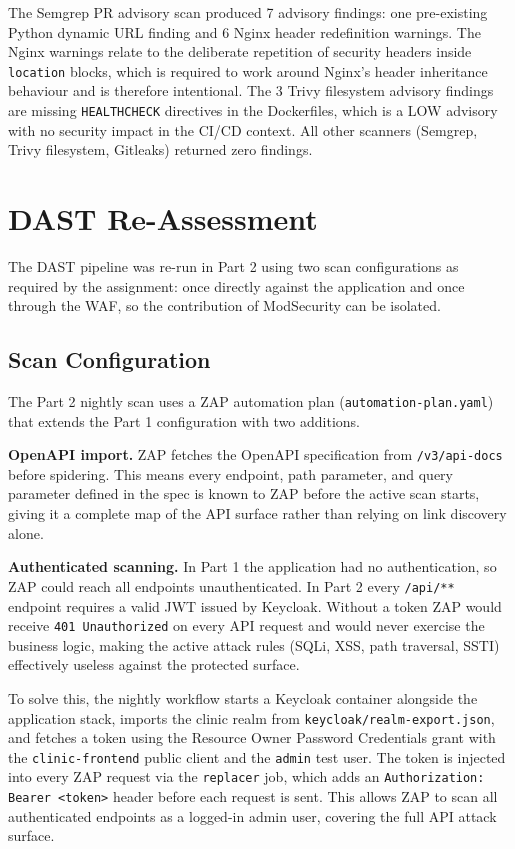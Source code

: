 \documentclass[12pt,a4paper]{report}
\begin{document}
The Semgrep PR advisory scan produced 7 advisory findings: one pre-existing Python dynamic
URL finding and 6 Nginx header redefinition warnings. The Nginx warnings relate to the
deliberate repetition of security headers inside \texttt{location} blocks, which is required
to work around Nginx's header inheritance behaviour and is therefore intentional. The 3 Trivy
filesystem advisory findings are missing \texttt{HEALTHCHECK} directives in the Dockerfiles,
which is a LOW advisory with no security impact in the CI/CD context. All other scanners
(Semgrep, Trivy filesystem, Gitleaks) returned zero findings.

\section{DAST Re-Assessment}

The DAST pipeline was re-run in Part 2 using two scan configurations as required by the
assignment: once directly against the application and once through the WAF, so the
contribution of ModSecurity can be isolated.

\subsection{Scan Configuration}

The Part 2 nightly scan uses a ZAP automation plan (\texttt{automation-plan.yaml}) that
extends the Part 1 configuration with two additions.

\textbf{OpenAPI import.} ZAP fetches the OpenAPI specification from
\texttt{/v3/api-docs} before spidering. This means every endpoint, path parameter,
and query parameter defined in the spec is known to ZAP before the active scan starts,
giving it a complete map of the API surface rather than relying on link discovery alone.

\textbf{Authenticated scanning.} In Part 1 the application had no authentication, so
ZAP could reach all endpoints unauthenticated. In Part 2 every \texttt{/api/**} endpoint
requires a valid JWT issued by Keycloak. Without a token ZAP would receive \texttt{401
Unauthorized} on every API request and would never exercise the business logic, making
the active attack rules (SQLi, XSS, path traversal, SSTI) effectively useless against
the protected surface.

To solve this, the nightly workflow starts a Keycloak container alongside the application
stack, imports the clinic realm from \texttt{keycloak/realm-export.json}, and fetches a
token using the Resource Owner Password Credentials grant with the \texttt{clinic-frontend}
public client and the \texttt{admin} test user. The token is injected into every ZAP
request via the \texttt{replacer} job, which adds an \texttt{Authorization: Bearer
<token>} header before each request is sent. This allows ZAP to scan all authenticated
endpoints as a logged-in admin user, covering the full API attack surface.
\end{document}
